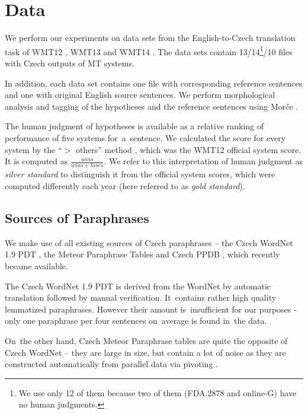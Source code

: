 \documentclass[11pt]{article}
\def\Tref#1{Table~\ref{#1}}
\begin{document}
\section{Data}
We perform our experiments on data sets from the English-to-Czech translation 
task of WMT12 \cite{wmt12}, WMT13 \cite{wmt13} and WMT14 \cite{wmt14}. The data 
sets contain 13/14\footnote{We use only 12 of them because two of them (FDA.2878 
and online-G) have no human judgments.}/10 files with Czech outputs of MT systems.

In addition, each data set contains one file with corresponding reference sentences 
and one with original English source sentences. We perform morphological analysis 
and tagging of the hypotheses and the reference sentences using Morče \cite{morce:2007}.

The human judgment of hypotheses is available as a relative ranking of performance of 
five systems for~a~sentence. We calculated the score for every system by the “$ > $ others” 
method \cite{bojar-grains}, which was the WMT12 official system score. It is computed 
as $ \frac{wins}{wins+loses} $. We refer to this interpretation of human judgment as 
\textit{silver standard} to distinguish it from the official system scores, which were 
computed differently each year (here referred to as \textit{gold standard}).

\subsection{Sources of Paraphrases}
We make use of all existing sources of Czech paraphrases -- the Czech WordNet 1.9 PDT 
\cite{czech-wordnet}, the Meteor Paraphrase Tables \cite{meteor-tables} and Czech PPDB %
, which recently became available.

The Czech WordNet 1.9 PDT is derived from the WordNet \cite{wordnet} by automatic translation 
followed by manual verification. It~contains rather high quality lemmatized paraphrases. However 
their amount is~insufficient for our purposes %
- only one paraphrase per four sentences on~average is found in~the data. %

On~the other hand, Czech Meteor Paraphrase tables are quite the opposite of Czech WordNet -- 
they are large in size, but contain a lot of noise as they are constructed automatically 
from parallel data via pivoting \cite{pivoting}. 
\end{document}
